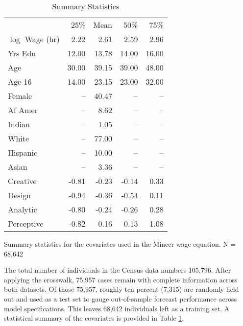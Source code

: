 \documentclass[12pt]{article}
\theoremstyle{definition}
\begin{document}
\begin{table}[t!] \centering
  \caption{Summary Statistics}
  \begin{threeparttable}
    \begin{tabular}[l]{l r r r r}
  \cmidrule{1-5}

                   & 25\%   & Mean & 50\% & 75\%    \\
  \cmidrule{1-5}
  $\log$ Wage (hr) &  2.22 &  2.61 &  2.59  &  2.96 \\
  Yrs Edu          & 12.00 & 13.78 & 14.00  & 16.00 \\
  Age              & 30.00 & 39.15 & 39.00  & 48.00 \\
  Age-16           & 14.00 & 23.15 & 23.00  & 32.00 \\
  Female           & --    & 40.47 & --     & --    \\
  Af Amer          & --    &  8.62 & --     & --    \\
  Indian           & --    &  1.05 & --     & --    \\
  White            & --    & 77.00 & --     & --    \\
  Hispanic         & --    & 10.00 & --     & --    \\
  Asian            & --    &  3.36 & --     & --    \\
  Creative         & -0.81 & -0.23 & -0.14  &  0.33 \\
  Design           & -0.94 & -0.36 & -0.54  &  0.11 \\
  Analytic         & -0.80 & -0.24 & -0.26  &  0.28 \\
  Perceptive       & -0.82 &  0.16 &  0.13  &  1.08 \\

  \hline
    \end{tabular}
    \begin{tablenotes}
      \item{\footnotesize Summary statistics for the covariates used in the Mincer wage equation. N = 68,642}
    \end{tablenotes} \label{tbl:census_cov_summary}
  \end{threeparttable}
\end{table}

The total number of individuals in the Census data numbers 105,796. After applying the crosswalk, 75,957 cases remain with complete information across both datasets. Of those 75,957, roughly ten percent (7,315) are randomly held out and used as a test set to gauge out-of-sample forecast performance across model specifications. This leaves 68,642 individuals left as a training set. A statistical summary of the covariates is provided in Table \ref{tbl:census_cov_summary}.
\end{document}
